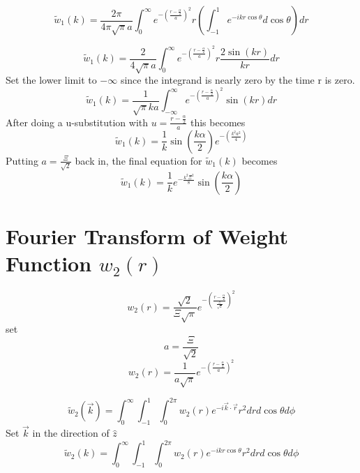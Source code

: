 \documentclass[double,12pt]{beavtex}
\begin{document}
\begin{equation}{\widetilde{w}_1(k)=\frac{2\pi}{4{\pi}\sqrt{\pi}a}\int_{0}^{\infty}e^{-\left(\frac{r-\frac{\alpha}{2}}{a}\right)^2}r\left(\int_{-1}^{1}e^{-ikr\cos\theta}d{\cos\theta}\right)d{r}}\end{equation}

\begin{equation}{\widetilde{w}_1(k)=\frac{2}{4\sqrt{\pi}a}\int_{0}^{\infty}e^{-\left(\frac{r-\frac{\alpha}{2}}{a}\right)^2}r\frac{2\sin(kr)}{kr}d{r}}\end{equation}
Set the lower limit to $-\infty$ since the integrand is nearly zero by the time r is zero. 
\begin{equation}{\widetilde{w}_1(k)=\frac{1}{\sqrt{\pi}ka}\int_{-\infty}^{\infty}e^{-\left(\frac{r-\frac{\alpha}{2}}{a}\right)^2}\sin(kr)d{r}}\end{equation}
After doing a u-substitution with $u=\frac{r-\frac{\alpha}{2}}{a}$ this becomes
\begin{equation}{\widetilde{w}_1(k)=\frac{1}{k}\sin\left(\frac{k\alpha}{2}\right)e^{-\left(\frac{k^2a^2}{4}\right)}}\end{equation}
Putting $a=\frac{\Xi}{\sqrt{2}}$ back in, the final equation for $\widetilde{w}_1(k)$ becomes
\begin{equation}
    \widetilde{w}_1(k)=\frac{1}{k}e^{-\frac{k^2\Xi^2}{8}}\sin\left(\frac{k\alpha}{2}\right)
\end{equation}

\section{Fourier Transform of Weight Function $w_{2}(r)$}
\begin{equation}{w_2(r)=\frac{\sqrt{2}}{\Xi\sqrt{\pi}}e^{-\left(\frac{r-\frac{\alpha}{2}}{\frac{\Xi}{\sqrt{2}}}\right)^2}}\end{equation}
set 
\begin{equation}{a=\frac{\Xi}{\sqrt{2}}}\end{equation}
\begin{equation}{w_2(r)=\frac{1}{a\sqrt{\pi}}e^{-\left(\frac{r-\frac{\alpha}{2}}{a}\right)^2}}\end{equation}

\begin{equation}{\widetilde{w}_2(\vec{k})=\int_{0}^{\infty}\int_{-1}^{1}\int_{0}^{2\pi}w_2(r)e^{-i\vec{k}\cdot{\vec{r}}}r^2d{r}d{\cos\theta}d{\phi}}\end{equation}
Set $\vec{k}$ in the direction of $\hat{z}$ 
\begin{equation}{\widetilde{w}_2(k)=\int_{0}^{\infty}\int_{-1}^{1}\int_{0}^{2\pi}w_2(r)e^{-ikr\cos\theta}r^2d{r}d{\cos\theta}d{\phi}}\end{equation}
\end{document}
